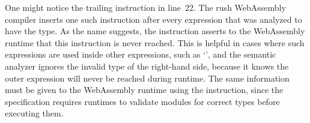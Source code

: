 One might notice the trailing  instruction in line~22.
The rush WebAssembly compiler inserts one such instruction after every expression that was analyzed to have the \qVerb{!} type.
As the name suggests, the instruction asserts to the WebAssembly runtime that this instruction is never reached.
This is helpful in cases where such expressions are used inside other expressions, such as `', and the semantic analyzer ignores the invalid type of the right-hand side, because it knows the outer expression will never be reached during runtime.
The same information must be given to the WebAssembly runtime using the  instruction, since the specification requires runtimes to validate modules for correct types before executing them.

